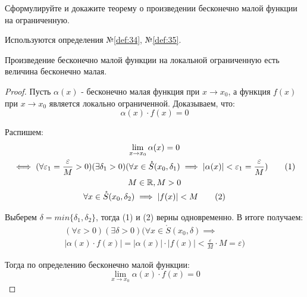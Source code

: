 \begin{question}
    Сформулируйте и докажите теорему о произведении бесконечно малой функции на ограниченную.
\end{question}
\begin{used}
    Используются определения №\ref{def:34}, №\ref{def:35}.
\end{used}
\begin{theorem}
    Произведение бесконечно малой функции на локальной ограниченную есть величина бесконечно малая.
\end{theorem}
\begin{proof}
    Пусть $\alpha(x)$ - бесконечно малая функция при $x \to x_0$, а функция $f(x)$ при $x \to  x_0$ является локально ограниченной. Доказываем, что: \[
        \alpha(x) \cdot f(x) = 0
    \] 

    Распишем:
    \begin{gather*}
        \lim_{x \to x_0} \alpha(x) = 0 \\
        \iff (\forall \varepsilon_1 = \frac{\varepsilon}{M} > 0)(\exists \delta_1 > 0)(\forall x \in \mathring{S}(x_0, \delta_1) \implies |\alpha(x)| < \varepsilon_1 = \frac{\varepsilon}{M}) \tag{1}\\
        M \in \mathbb{R}, M > 0 \\
        \forall x \in  \mathring{S}(x_0, \delta_2) \implies |f(x)| < M \tag{2} \\ 
    \end{gather*}

    Выберем $\delta = min \{\delta_1, \delta_2\} $, тогда (1) и (2) верны одновременно. В итоге получаем:
    \begin{gather*}
        (\forall \varepsilon > 0)(\exists \delta > 0)(\forall x \in \mathring{S}(x_0, \delta) \implies \\
        |\alpha(x) \cdot f(x)| = |\alpha(x)| \cdot |f(x)| < \frac{\varepsilon}{M} \cdot M = \varepsilon)  
    \end{gather*}

    Тогда по определению бесконечно малой функции: \[
        \lim_{x \to x_0} \alpha(x) \cdot f(x) = 0
    \] 
\end{proof}
\pagebreak



